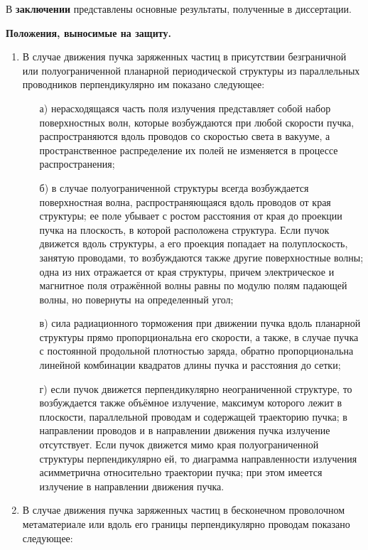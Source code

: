 В \textbf{заключении} представлены основные результаты, полученные в диссертации.

\textbf{Положения, выносимые на защиту. }
\begin{enumerate}
  \item В случае движения пучка заряженных частиц в присутствии безграничной или полуограниченной планарной периодической структуры из параллельных проводников перпендикулярно им показано следующее:
      \begin{itemize}
        \item[а)] нерасходящаяся часть поля излучения представляет собой набор поверхностных волн, которые возбуждаются при любой скорости пучка, распространяются вдоль проводов со скоростью света в вакууме, а пространственное распределение их полей не изменяется в процессе распространения;
        \item[б)] в случае полуограниченной структуры всегда возбуждается поверхностная волна, распространяющаяся вдоль проводов от края структуры; ее поле убывает с ростом расстояния от края до проекции пучка на плоскость, в которой расположена структура. Если пучок движется вдоль структуры, а его проекция попадает на полуплоскость, занятую проводами, то возбуждаются также другие поверхностные волны; одна из них отражается от края структуры, причем электрическое и магнитное поля отражённой волны равны по модулю полям падающей волны, но повернуты на определенный угол;
        \item[в)] сила радиационного торможения при движении пучка вдоль планарной структуры прямо пропорциональна его скорости, а также, в случае  пучка с постоянной продольной плотностью заряда, обратно пропорциональна линейной комбинации квадратов длины пучка и расстояния до сетки;
        \item[г)] если пучок движется перпендикулярно неограниченной структуре, то возбуждается также объёмное излучение, максимум которого лежит в плоскости, параллельной проводам и содержащей траекторию пучка; в направлении проводов и в направлении движения пучка излучение отсутствует. Если пучок движется мимо края полуограниченной структуры перпендикулярно ей, то диаграмма направленности излучения асимметрична относительно траектории пучка; при этом имеется излучение в направлении движения пучка.
      \end{itemize}
  \item В случае движения пучка заряженных частиц в бесконечном проволочном метаматериале или вдоль его границы перпендикулярно проводам показано следующее:
      \begin{itemize}

\end{itemize}
\end{enumerate}
